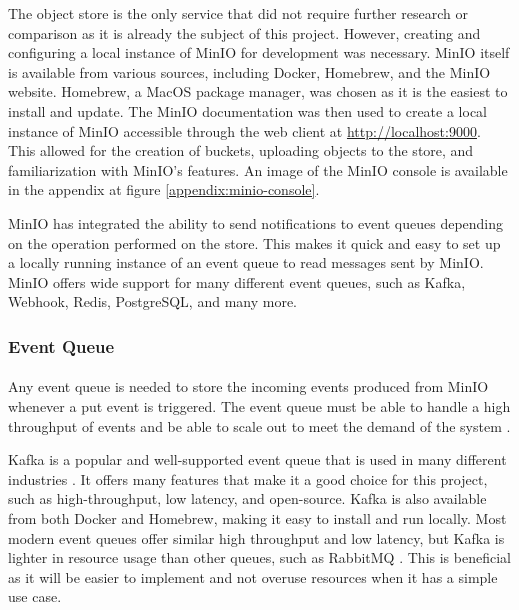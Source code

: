 \documentclass[12pt, conference, final, a4paper, onecolumn, compsoc]{IEEEtran}
\begin{document}
The object store is the only service that did not require further research or
comparison as it is already the subject of this project. However, creating and
configuring a local instance of MinIO for development was necessary. MinIO
itself is available from various sources, including Docker, Homebrew, and the
MinIO website. Homebrew, a MacOS package manager, was chosen as it is the
easiest to install and update. The MinIO documentation was then used to create a
local instance of MinIO accessible through the web client
at \url{http://localhost:9000}. This allowed for the creation of buckets,
uploading objects to the store, and familiarization with MinIO's features. An
image of the MinIO console is available in the appendix at figure
\ref{appendix:minio-console}.


MinIO has integrated the ability to send notifications to event queues depending
on the operation performed on the store. This makes it quick and easy to set up
a locally running instance of an event queue to read messages sent by MinIO.
MinIO offers wide support for many different event queues, such as Kafka,
Webhook, Redis, PostgreSQL, and many more.

\subsubsection*{Event Queue}
\paragraph{}

Any event queue is needed to store the incoming events produced from MinIO
whenever a put event is triggered. The event queue must be able to handle a high
throughput of events and be able to scale out to meet the demand of the system
\citep{event-driven-arch}.

Kafka is a popular and well-supported event queue that is used in many different
industries \citep{event-driven-arch}. It offers many features that make it a
good choice for this project, such as high-throughput, low latency, and
open-source. Kafka is also available from both Docker and Homebrew, making it
easy to install and run locally. Most modern event queues offer similar high
throughput and low latency, but Kafka is lighter in resource usage than other
queues, such as RabbitMQ \citep{kafka-rabbitmq}. This is beneficial as it will
be easier to implement and not overuse resources when it has a simple use case.
\end{document}
